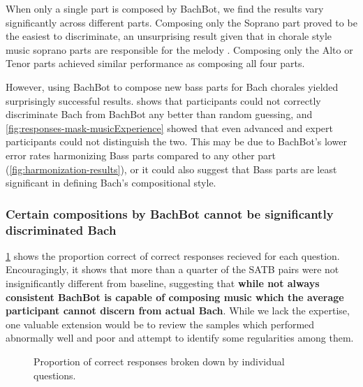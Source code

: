 When only a single part is composed by BachBot, we find the results vary
significantly across different parts. Composing only the Soprano part proved to be
the easiest to discriminate, an unsurprising result given that in chorale style
music soprano parts are responsible for the melody \citep{denny1960oxford}.
Composing only the Alto or Tenor parts achieved similar performance as composing
all four parts.

However, using BachBot to compose new bass parts for Bach chorales yielded
surprisingly successful results.  shows that
participants could not correctly discriminate Bach from BachBot any better than
random guessing, and \cref{fig:responses-mask-musicExperience} showed that even
advanced and expert participants could not distinguish the two. This may be due
to BachBot's lower error rates harmonizing Bass parts compared to any other
part (\vref{fig:harmonization-results}), or it could also suggest that Bass
parts are least significant in defining Bach's compositional style.

\subsubsection{Certain compositions by BachBot cannot be significantly discriminated Bach}

\cref{fig:responses-name} shows the proportion correct of correct responses
recieved for each question. Encouragingly, it shows that more than a quarter of
the SATB pairs were not insignificantly different from baseline, suggesting
that \textbf{while not always consistent BachBot is capable of composing music
which the average participant cannot discern from actual Bach}. While we lack the
expertise, one valuable extension would be to review the samples which performed
abnormally well and poor and attempt to identify some regularities among them.

\begin{figure}[tb]
  \centering
  
  \caption{Proportion of correct responses broken down by individual questions.}
  \label{fig:responses-name}
\end{figure}



